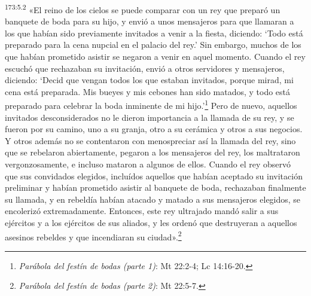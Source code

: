 \par
\textsuperscript{173:5.2} «El reino de los cielos se puede comparar con un rey que preparó un banquete de boda para su hijo, y envió a unos mensajeros para que llamaran a los que habían sido previamente invitados a venir a la fiesta, diciendo: `Todo está preparado para la cena nupcial en el palacio del rey.' Sin embargo, muchos de los que habían prometido asistir se negaron a venir en aquel momento. Cuando el rey escuchó que rechazaban su invitación, envió a otros servidores y mensajeros, diciendo: `Decid que vengan todos los que estaban invitados, porque mirad, mi cena está preparada. Mis bueyes y mis cebones han sido matados, y todo está preparado para celebrar la boda inminente de mi hijo.'\footnote{\textit{Parábola del festín de bodas (parte 1)}: Mt 22:2-4; Lc 14:16-20.} Pero de nuevo, aquellos invitados desconsiderados no le dieron importancia a la llamada de su rey, y se fueron por su camino, uno a su granja, otro a su cerámica y otros a sus negocios. Y otros además no se contentaron con menospreciar así la llamada del rey, sino que se rebelaron abiertamente, pegaron a los mensajeros del rey, los maltrataron vergonzosamente, e incluso mataron a algunos de ellos. Cuando el rey observó que sus convidados elegidos, incluídos aquellos que habían aceptado su invitación preliminar y habían prometido asistir al banquete de boda, rechazaban finalmente su llamada, y en rebeldía habían atacado y matado a sus mensajeros elegidos, se encolerizó extremadamente. Entonces, este rey ultrajado mandó salir a sus ejércitos y a los ejércitos de sus aliados, y les ordenó que destruyeran a aquellos asesinos rebeldes y que incendiaran su ciudad».\footnote{\textit{Parábola del festín de bodas (parte 2)}: Mt 22:5-7.}

